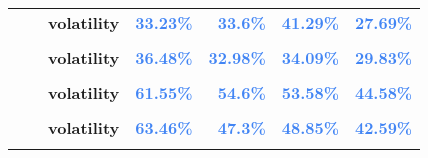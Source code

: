 \documentclass[
  authoryear,
  preprint,
  3p]{elsarticle}
\begin{document}
\begin{longtable}[t]{>{}l>{}l>{}l>{}r>{}r>{}r>{}r}
\textbf{} & \textbf{} & \textbf{volatility} & \textcolor[HTML]{4285f4}{\textbf{33.23\%}} & \textcolor[HTML]{4285f4}{\textbf{33.6\%}} & \textcolor[HTML]{4285f4}{\textbf{41.29\%}} & \textcolor[HTML]{4285f4}{\textbf{27.69\%}}\\
\textbf{\cellcolor{gray!10}{}} & \textbf{\cellcolor{gray!10}{contango}} & \textbf{\cellcolor{gray!10}{mean}} & \textcolor[HTML]{4285f4}{\textbf{\cellcolor{gray!10}{-20.49\%}}} & \textcolor[HTML]{4285f4}{\textbf{\cellcolor{gray!10}{20.35\%}}} & \textcolor[HTML]{4285f4}{\textbf{\cellcolor{gray!10}{21.47\%}}} & \textcolor[HTML]{4285f4}{\textbf{\cellcolor{gray!10}{4.7\%}}}\\
\textbf{} & \textbf{} & \textbf{volatility} & \textcolor[HTML]{4285f4}{\textbf{36.48\%}} & \textcolor[HTML]{4285f4}{\textbf{32.98\%}} & \textcolor[HTML]{4285f4}{\textbf{34.09\%}} & \textcolor[HTML]{4285f4}{\textbf{29.83\%}}\\
\addlinespace
\textbf{\cellcolor{gray!10}{Natural gas (XNYM)}} & \textbf{\cellcolor{gray!10}{whole period}} & \textbf{\cellcolor{gray!10}{mean}} & \textcolor[HTML]{4285f4}{\textbf{\cellcolor{gray!10}{35.38\%}}} & \textcolor[HTML]{4285f4}{\textbf{\cellcolor{gray!10}{16.25\%}}} & \textcolor[HTML]{4285f4}{\textbf{\cellcolor{gray!10}{0.93\%}}} & \textcolor[HTML]{4285f4}{\textbf{\cellcolor{gray!10}{8.33\%}}}\\
\textbf{} & \textbf{} & \textbf{volatility} & \textcolor[HTML]{4285f4}{\textbf{61.55\%}} & \textcolor[HTML]{4285f4}{\textbf{54.6\%}} & \textcolor[HTML]{4285f4}{\textbf{53.58\%}} & \textcolor[HTML]{4285f4}{\textbf{44.58\%}}\\
\textbf{\cellcolor{gray!10}{}} & \textbf{\cellcolor{gray!10}{backwardation}} & \textbf{\cellcolor{gray!10}{mean}} & \textcolor[HTML]{4285f4}{\textbf{\cellcolor{gray!10}{**85.84\%}}} & \textcolor[HTML]{4285f4}{\textbf{\cellcolor{gray!10}{4.76\%}}} & \textcolor[HTML]{4285f4}{\textbf{\cellcolor{gray!10}{-2.32\%}}} & \textcolor[HTML]{4285f4}{\textbf{\cellcolor{gray!10}{18.33\%}}}\\
\textbf{} & \textbf{} & \textbf{volatility} & \textcolor[HTML]{4285f4}{\textbf{63.46\%}} & \textcolor[HTML]{4285f4}{\textbf{47.3\%}} & \textcolor[HTML]{4285f4}{\textbf{48.85\%}} & \textcolor[HTML]{4285f4}{\textbf{42.59\%}}\\
\textbf{\cellcolor{gray!10}{}} & \textbf{\cellcolor{gray!10}{contango}} & \textbf{\cellcolor{gray!10}{mean}} & \textcolor[HTML]{4285f4}{\textbf{\cellcolor{gray!10}{-11.98\%}}} & \textcolor[HTML]{4285f4}{\textbf{\cellcolor{gray!10}{27.84\%}}} & \textcolor[HTML]{4285f4}{\textbf{\cellcolor{gray!10}{4.77\%}}} & \textcolor[HTML]{4285f4}{\textbf{\cellcolor{gray!10}{3.25\%}}}\\

\end{longtable}
\end{document}

